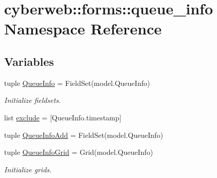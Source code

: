 \hypertarget{namespacecyberweb_1_1forms_1_1queue__info}{\section{cyberweb\-:\-:forms\-:\-:queue\-\_\-info \-Namespace \-Reference}
\label{namespacecyberweb_1_1forms_1_1queue__info}
}
\subsection*{\-Variables}
\begin{DoxyCompactItemize}
\item 
tuple \hyperlink{namespacecyberweb_1_1forms_1_1queue__info_a605db563d4e830522692eda24139a57f}{\-Queue\-Info} = \-Field\-Set(model.\-Queue\-Info)
\begin{DoxyCompactList}\small\item\em \-Initialize fieldsets. \end{DoxyCompactList}\item 
list \hyperlink{namespacecyberweb_1_1forms_1_1queue__info_a0fbb22257d39b53df74d7274cc3524be}{exclude} = \mbox{[}\-Queue\-Info.\-timestamp\mbox{]}
\item 
tuple \hyperlink{namespacecyberweb_1_1forms_1_1queue__info_a433f61c277cb632ece0ccc7bd155a721}{\-Queue\-Info\-Add} = \-Field\-Set(model.\-Queue\-Info)
\item 
tuple \hyperlink{namespacecyberweb_1_1forms_1_1queue__info_ab0853d5c5f3e469798f4c25debeb0780}{\-Queue\-Info\-Grid} = \-Grid(model.\-Queue\-Info)
\begin{DoxyCompactList}\small\item\em \-Initialize grids. \end{DoxyCompactList}\end{DoxyCompactItemize}


